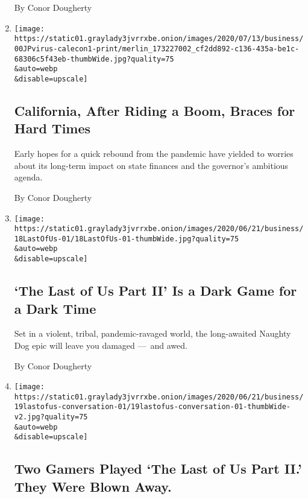 \begin{enumerate}
  By Conor Dougherty
\item
  \href{/2020/07/10/business/economy/california-economy-coronavirus.html}{}

  \texttt{[image: https://static01.graylady3jvrrxbe.onion/images/2020/07/13/business/00JPvirus-calecon1-print/merlin\_173227002\_cf2dd892-c136-435a-be1c-68306c5f43eb-thumbWide.jpg?quality=75\\\&auto=webp\\\&disable=upscale]}

  \hypertarget{california-after-riding-a-boom-braces-for-hard-times}{%
  \subsection{California, After Riding a Boom, Braces for Hard
  Times}\label{california-after-riding-a-boom-braces-for-hard-times}}

  Early hopes for a quick rebound from the pandemic have yielded to
  worries about its long-term impact on state finances and the
  governor's ambitious agenda.

  By Conor Dougherty
\item
  \href{/2020/06/19/business/last-of-us-2-review.html}{}

  \texttt{[image: https://static01.graylady3jvrrxbe.onion/images/2020/06/21/business/18LastOfUs-01/18LastOfUs-01-thumbWide.jpg?quality=75\\\&auto=webp\\\&disable=upscale]}

  \hypertarget{the-last-of-us-part-ii-is-a-dark-game-for-a-dark-time}{%
  \subsection{`The Last of Us Part II' Is a Dark Game for a Dark
  Time}\label{the-last-of-us-part-ii-is-a-dark-game-for-a-dark-time}}

  Set in a violent, tribal, pandemic-ravaged world, the long-awaited
  Naughty Dog epic will leave you damaged ---~and awed.

  By Conor Dougherty
\item
  \href{/2020/06/19/technology/last-of-us-2-gameplay.html}{}

  \texttt{[image: https://static01.graylady3jvrrxbe.onion/images/2020/06/21/business/19lastofus-conversation-01/19lastofus-conversation-01-thumbWide-v2.jpg?quality=75\\\&auto=webp\\\&disable=upscale]}

  \hypertarget{two-gamers-played-the-last-of-us-part-ii-they-were-blown-away}{%
  \subsection{Two Gamers Played `The Last of Us Part II.' They Were
  Blown
  Away.}\label{two-gamers-played-the-last-of-us-part-ii-they-were-blown-away}}


\end{enumerate}
